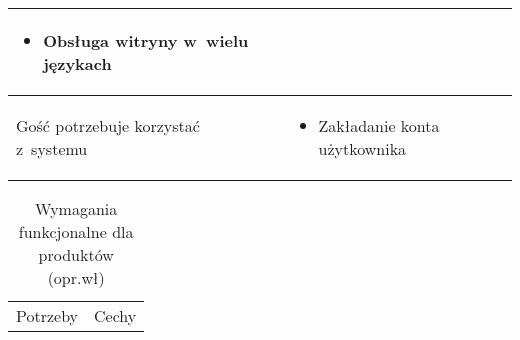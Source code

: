\begin{minipage}{\textwidth}
\begin{table}[H]
\begin{tabular}{|P{.3\textwidth}|P{.6\textwidth}|}
\begin{itemize}
                \item Obsługa witryny w~wielu językach
            \end{itemize} \\
            \hline
            Gość potrzebuje korzystać z~systemu &
            \begin{itemize}
                \item Zakładanie konta użytkownika
            \end{itemize} \\
            \hline
        \end{tabular}
    \end{table}
\end{minipage}

\begin{minipage}{\textwidth}
    \begin{table}[H]
        \centering\caption{Wymagania funkcjonalne dla produktów (opr.wł)\label{tabela:wymaganiaFunkcjonalneProdukty}}
        \begin{tabular}{|P{.3\textwidth}|P{.6\textwidth}|}
            \hline
            Potrzeby & Cechy \\


\end{tabular}
\end{table}
\end{minipage}
